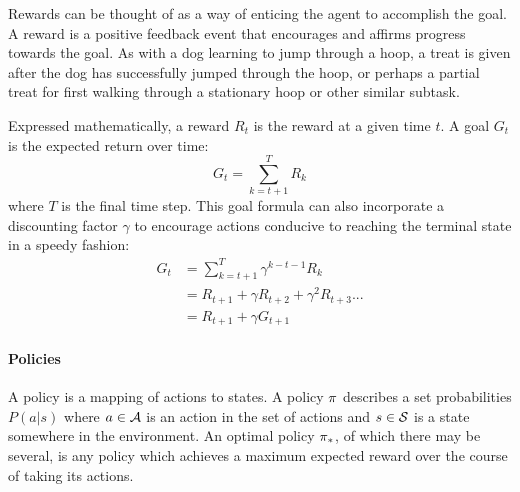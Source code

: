 Rewards can be thought of as a way of enticing the agent to accomplish the goal.
%
A reward is a positive feedback event that encourages and affirms progress
towards the goal.
%
As with a dog learning to jump through a hoop,
a treat is given after the dog has successfully jumped through the hoop,
or perhaps a partial treat for first walking through a stationary hoop
or other similar subtask.

Expressed mathematically, a reward $R_t$ is the reward at a given time $t$.
%
A goal $G_t$ is the expected return over time:
\[
	G_t = \sum_{k=t+1}^{T} R_k
\]
where $T$ is the final time step.
%
This goal formula can also incorporate a discounting factor $\gamma$ to
encourage actions conducive to reaching the terminal state in a speedy fashion:
\begin{align*}
	G_t &= \sum_{k=t+1}^{T} \gamma^{k-t-1} R_k \\
		&= R_{t+1} + \gamma R_{t+2} + \gamma^2 R_{t+3} ... \\
		&= R_{t+1} + \gamma G_{t+1}
\end{align*}

\paragraph*{Policies}

A policy is a mapping of actions to states.
%
A policy $\pi$ describes a set probabilities $P(a|s)$ where
$a \in \mathcal{A}$ is an action in the set of actions
and $s \in \mathcal{S}$ is a state somewhere in the environment.
%
An optimal policy $\pi_*$,
of which there may be several,
is any policy which achieves a maximum expected reward over the course of
taking its actions.

